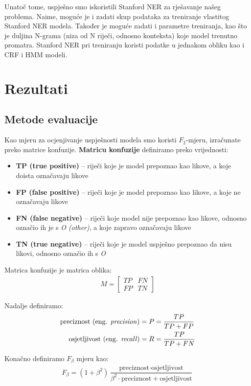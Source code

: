 \documentclass[conference]{IEEEtran}
\begin{document}
	Unatoč tome, uspješno smo iskoristili Stanford NER za rješavanje našeg problema. Naime, moguće je i zadati skup podataka za treniranje vlastitog Stanford NER modela. Također je moguće zadati i parametre treniranja, kao što je duljina N-grama (niza od N riječi, odnosno konteksta) koje model trenutno promatra. Stanford NER pri treniranju koristi podatke u jednakom obliku kao i CRF i HMM modeli.
	
	
\section{Rezultati}

	\subsection{Metode evaluacije}
		Kao mjeru za ocjenjivanje uspješnosti modela smo koristi $F_2$-mjeru, izračunate preko matrice konfuzije.
		\textbf{Matricu konfuzije} definiramo preko vrijednosti:
		\begin{itemize}
			\item \textbf{TP (true positive)} -- riječi koje je model prepoznao kao likove, a koje doista označavaju likove
			\item \textbf{FP (false positive)} -- riječi koje je model prepoznao kao likove, a koje ne označavaju likove
			\item \textbf{FN (false negative)} -- riječi koje model nije prepoznao kao likove, odnosno označio ih je s \textit{O (other)}, a koje zapravo označavaju likove
			\item \textbf{TN (true negative)} -- riječi koje je model uspješno prepoznao da nisu likovi, odnosno označio ih s \textit{O}
		\end{itemize}
		
		Matrica konfuzije je matrica oblika:
		\begin{align*}
		M = \begin{bmatrix} TP & FN\\ FP & TN \end{bmatrix}
		\end{align*}
		
		Nadalje definiramo:
		\begin{align*}
		\text{preciznost (eng. \textit{precision})} = P &= \frac{TP}{TP + FP} \\
		\text{osjetljivost (eng.  \textit{recall})} = R &= \frac{TP}{TP + FN}
		\end{align*}
		
		Konačno definiramo $F_\beta$ mjeru kao:
		\begin{align*}
		F_\beta = (1+\beta^2) \dfrac{\text{preciznost} \cdot \text{osjetljivost}}
		{\beta^2 \cdot \text{preciznost} + \text{osjetljivost}}
		\end{align*}
		
\end{document}
